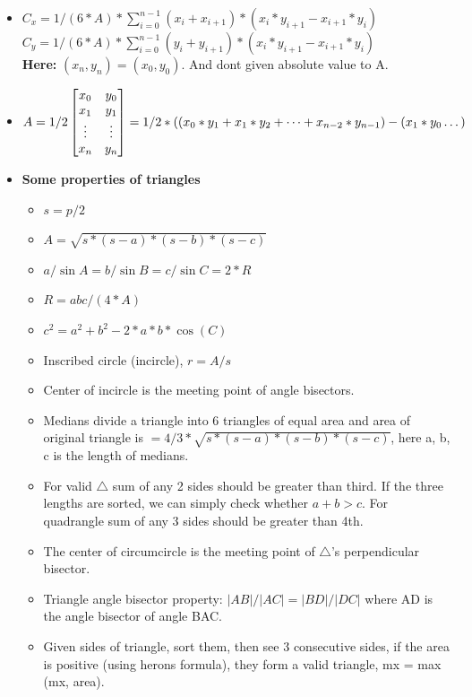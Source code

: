 \documentclass[8pt, a4paper, oneside, twocolumn]{extarticle}
\begin{document}
\begin{itemize}
    \item $C_x = 1/(6*A)*\sum_{i = 0}^{n - 1}(x_i + x_{i + 1}) * (x_i * y_{i + 1} - x_{i + 1} * y_i)$
    \\$C_y = 1/(6*A)*\sum_{i = 0}^{n - 1}(y_i + y_{i + 1}) * (x_i * y_{i + 1} - x_{i + 1} * y_i)$
    \\\textbf{Here: }$(x_n, y_n) = (x_0, y_0)$. And dont given absolute value to A.
    \item \[A = 1/2\begin{bmatrix}
    x_0 & y_0\\
    x_1 & y_1\\
    \vdots & \vdots\\
    x_n & y_n
    \end{bmatrix} = 1/2 * ((x_0 * y_1 + x_1 * y_2 + \dots + x_{n - 2} * y_{n - 1})\\
     - (x_1*y_0 \dots)\]
    \item \textbf{Some properties of triangles}
    \begin{itemize}
        \item $s = p/2$
        \item $A = \sqrt{s*(s - a)*(s - b)*(s - c)}$
        \item $a/\sin{A} = b/\sin{B} = c/\sin{C} = 2*R$
        \item $R = abc/(4*A)$
        \item $c^2 = a^2 + b^2 - 2*a*b*\cos(C)$
        \item Inscribed circle (incircle), $r = A/s$
        \item Center of incircle is the meeting point of angle bisectors.
        \item Medians divide a triangle into 6 triangles of equal area and area of original triangle is $= 4/3 * \sqrt{s * (s - a) * (s - b) * (s - c)}$, here a, b, c is the length of medians.
        \item For valid $\triangle$ sum of any 2 sides should be greater than third. If the three lengths are sorted, we can simply check whether $a + b > c$. For quadrangle sum of any 3 sides should be greater than 4th.
        \item The center of circumcircle is the meeting point of $\triangle$'s perpendicular bisector.
        \item Triangle angle bisector property: $|AB|/|AC| = |BD|/|DC|$ where AD is the angle bisector of angle BAC. 
        \item Given sides of triangle, sort them, then see 3 consecutive sides, if the area is positive (using herons formula), they form a valid triangle, mx = max (mx, area).

\end{itemize}
\end{itemize}
\end{document}
